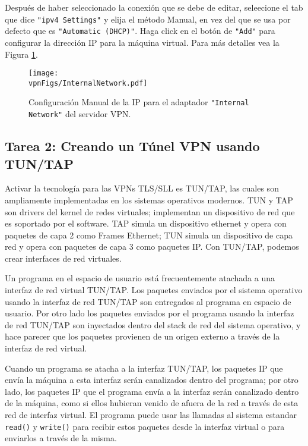 Después de haber seleccionado la conexión que se debe de editar, seleecione el tab que dice \texttt{"ipv4 Settings"} y elija el método Manual, en vez del que se usa por defecto que es \texttt{"Automatic (DHCP)"}. Haga click en el botón de \texttt{"Add"}  para configurar la dirección IP para la máquina virtual. Para más detalles vea la Figura  \ref{vpn:fig:internalnetwork}.



\begin{figure}[htb]
\begin{center}
\texttt{[image: \\vpnFigs/InternalNetwork.pdf]}
\end{center}
\caption{Configuración Manual de la IP para el adaptador \texttt{"Internal Network"} del servidor VPN.}
\label{vpn:fig:internalnetwork}
\end{figure}
 


\subsection{Tarea 2: Creando un Túnel VPN usando TUN/TAP}

Activar la tecnología para las VPNs TLS/SLL es TUN/TAP, las cuales son ampliamente implementadas en los sistemas operativos modernos.
TUN y TAP son drivers del kernel de redes virtuales; implementan un dispositivo de red que es soportado por el software.
TAP simula un dispositivo ethernet y opera con paquetes de capa 2 como Frames Ethernet; TUN simula un dispositivo de capa red y opera con paquetes de capa 3 como paquetes IP.
Con TUN/TAP, podemos crear interfaces de red virtuales.

Un programa en el espacio de usuario está frecuentemente atachada a una interfaz de red virtual TUN/TAP.
Los paquetes enviados por el sistema operativo usando la interfaz de red TUN/TAP son entregados al programa en espacio de usuario. Por otro lado los paquetes enviados por el programa usando la interfaz de red TUN/TAP son inyectados dentro del stack de red del sistema operativo, y hace parecer que los paquetes provienen de un origen externo a través de la interfaz de red virtual.

Cuando un programa se atacha a la interfaz TUN/TAP, los paquetes IP que envía la máquina a esta interfaz serán canalizados dentro del programa; por otro lado, los paquetes IP que el programa envía a la interfaz serán canalizado dentro de la máquina, como si ellos hubieran venido de afuera de la red a través de esta red de interfaz virtual. El programa puede usar las llamadas al sistema estandar  {\tt read()} y {\tt write()} para recibir estos paquetes desde la interfaz virtual o para enviarlos a través de la misma.

